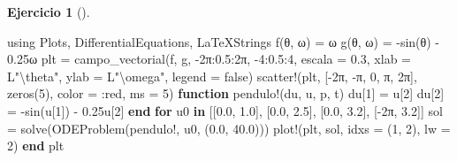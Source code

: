 \documentclass[
  spanish,
  a4paper,
]{scrreport}
\newenvironment{Shaded}{\begin{snugshade}}{\end{snugshade}}
\newcommand{\BuiltInTok}[1]{\textcolor[rgb]{0.00,0.23,0.31}{#1}}
\newcommand{\ConstantTok}[1]{\textcolor[rgb]{0.56,0.35,0.01}{#1}}
\newcommand{\ControlFlowTok}[1]{\textcolor[rgb]{0.00,0.23,0.31}{\textbf{#1}}}
\newcommand{\FloatTok}[1]{\textcolor[rgb]{0.68,0.00,0.00}{#1}}
\newcommand{\FunctionTok}[1]{\textcolor[rgb]{0.28,0.35,0.67}{#1}}
\newcommand{\ImportTok}[1]{\textcolor[rgb]{0.00,0.46,0.62}{#1}}
\newcommand{\KeywordTok}[1]{\textcolor[rgb]{0.00,0.23,0.31}{\textbf{#1}}}
\newcommand{\NormalTok}[1]{\textcolor[rgb]{0.00,0.23,0.31}{#1}}
\newcommand{\OperatorTok}[1]{\textcolor[rgb]{0.37,0.37,0.37}{#1}}
\newcommand{\SpecialCharTok}[1]{\textcolor[rgb]{0.37,0.37,0.37}{#1}}
\newcommand{\StringTok}[1]{\textcolor[rgb]{0.13,0.47,0.30}{#1}}
\theoremstyle{definition}
\newtheorem{exercise}{Ejercicio}[chapter]
\theoremstyle{remark}
\begin{document}
\begin{exercise}[]
\begin{enumerate}
\begin{tcolorbox}
\begin{Shaded}
\begin{Highlighting}[]
\ImportTok{using} \BuiltInTok{Plots}\NormalTok{, }\BuiltInTok{DifferentialEquations}\NormalTok{, }\BuiltInTok{LaTeXStrings}
\FunctionTok{f}\NormalTok{(θ, ω) }\OperatorTok{=}\NormalTok{ ω}
\FunctionTok{g}\NormalTok{(θ, ω) }\OperatorTok{=} \FunctionTok{{-}sin}\NormalTok{(θ) }\OperatorTok{{-}} \FloatTok{0.25}\NormalTok{ω}
\NormalTok{plt }\OperatorTok{=} \FunctionTok{campo\_vectorial}\NormalTok{(f, g, }\OperatorTok{{-}}\FloatTok{2}\NormalTok{π}\OperatorTok{:}\FloatTok{0.5}\OperatorTok{:}\FloatTok{2}\NormalTok{π, }\OperatorTok{{-}}\FloatTok{4}\OperatorTok{:}\FloatTok{0.5}\OperatorTok{:}\FloatTok{4}\NormalTok{, escala }\OperatorTok{=} \FloatTok{0.3}\NormalTok{,}
\NormalTok{    xlab }\OperatorTok{=}\NormalTok{ L}\StringTok{"}\SpecialCharTok{\textbackslash{}t}\StringTok{heta"}\NormalTok{, ylab }\OperatorTok{=}\NormalTok{ L}\StringTok{"\textbackslash{}omega"}\NormalTok{, legend }\OperatorTok{=} \ConstantTok{false}\NormalTok{)}
\FunctionTok{scatter!}\NormalTok{(plt, [}\OperatorTok{{-}}\FloatTok{2}\NormalTok{π, }\OperatorTok{{-}}\ConstantTok{π}\NormalTok{, }\FloatTok{0}\NormalTok{, }\ConstantTok{π}\NormalTok{, }\FloatTok{2}\NormalTok{π], }\FunctionTok{zeros}\NormalTok{(}\FloatTok{5}\NormalTok{), color }\OperatorTok{=} \OperatorTok{:}\NormalTok{red, ms }\OperatorTok{=} \FloatTok{5}\NormalTok{)}
\KeywordTok{function} \FunctionTok{pendulo!}\NormalTok{(du, u, p, t)}
\NormalTok{    du[}\FloatTok{1}\NormalTok{] }\OperatorTok{=}\NormalTok{ u[}\FloatTok{2}\NormalTok{]}
\NormalTok{    du[}\FloatTok{2}\NormalTok{] }\OperatorTok{=} \FunctionTok{{-}sin}\NormalTok{(u[}\FloatTok{1}\NormalTok{]) }\OperatorTok{{-}} \FloatTok{0.25}\NormalTok{u[}\FloatTok{2}\NormalTok{]}
\KeywordTok{end}
\ControlFlowTok{for}\NormalTok{ u0 }\KeywordTok{in}\NormalTok{ [[}\FloatTok{0.0}\NormalTok{, }\FloatTok{1.0}\NormalTok{], [}\FloatTok{0.0}\NormalTok{, }\FloatTok{2.5}\NormalTok{], [}\FloatTok{0.0}\NormalTok{, }\FloatTok{3.2}\NormalTok{], [}\OperatorTok{{-}}\FloatTok{2}\NormalTok{π, }\FloatTok{3.2}\NormalTok{]]}
\NormalTok{    sol }\OperatorTok{=} \FunctionTok{solve}\NormalTok{(}\FunctionTok{ODEProblem}\NormalTok{(pendulo!, u0, (}\FloatTok{0.0}\NormalTok{, }\FloatTok{40.0}\NormalTok{)))}
    \FunctionTok{plot!}\NormalTok{(plt, sol, idxs }\OperatorTok{=}\NormalTok{ (}\FloatTok{1}\NormalTok{, }\FloatTok{2}\NormalTok{), lw }\OperatorTok{=} \FloatTok{2}\NormalTok{)}
\ControlFlowTok{end}
\NormalTok{plt}
\end{Highlighting}
\end{Shaded}


\end{tcolorbox}
\end{enumerate}
\end{exercise}
\end{document}
